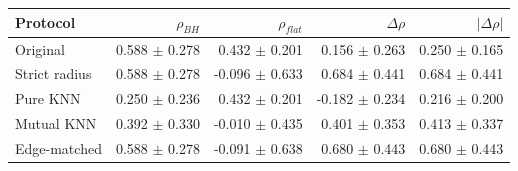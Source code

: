 \begin{tabular}{l r r r r}
\toprule
Protocol & $\rho_{BH}$ & $\rho_{flat}$ & $\Delta\rho$ & $|\Delta\rho|$ \\
\midrule
Original & 0.588 $\pm$ 0.278 & 0.432 $\pm$ 0.201 & 0.156 $\pm$ 0.263 & 0.250 $\pm$ 0.165 \\
Strict radius & 0.588 $\pm$ 0.278 & -0.096 $\pm$ 0.633 & 0.684 $\pm$ 0.441 & 0.684 $\pm$ 0.441 \\
Pure KNN & 0.250 $\pm$ 0.236 & 0.432 $\pm$ 0.201 & -0.182 $\pm$ 0.234 & 0.216 $\pm$ 0.200 \\
Mutual KNN & 0.392 $\pm$ 0.330 & -0.010 $\pm$ 0.435 & 0.401 $\pm$ 0.353 & 0.413 $\pm$ 0.337 \\
Edge-matched & 0.588 $\pm$ 0.278 & -0.091 $\pm$ 0.638 & 0.680 $\pm$ 0.443 & 0.680 $\pm$ 0.443 \\
\bottomrule
\end{tabular}